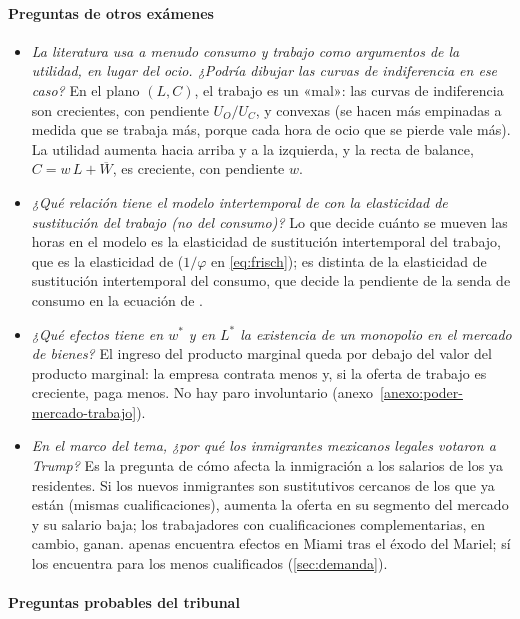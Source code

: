 \documentclass[11pt]{article}
\begin{document}
\paragraph{Preguntas de otros exámenes}

\begin{itemize}
\item \emph{La literatura usa a menudo consumo y trabajo como argumentos de la utilidad, en lugar del ocio. ¿Podría dibujar las curvas de indiferencia en ese caso?} En el plano $(L,C)$, el trabajo es un «mal»: las curvas de indiferencia son crecientes, con pendiente $U_O/U_C$, y convexas (se hacen más empinadas a medida que se trabaja más, porque cada hora de ocio que se pierde vale más). La utilidad aumenta hacia arriba y a la izquierda, y la recta de balance, $C=w\,L+\overline{W}$, es creciente, con pendiente $w$.
\item \emph{¿Qué relación tiene el modelo intertemporal de  con la elasticidad de sustitución del trabajo (no del consumo)?} Lo que decide cuánto se mueven las horas en el modelo es la elasticidad de sustitución intertemporal del trabajo, que es la elasticidad de  ($1/\varphi$ en \eqref{eq:frisch}); es distinta de la elasticidad de sustitución intertemporal del consumo, que decide la pendiente de la senda de consumo en la ecuación de  .
\item \emph{¿Qué efectos tiene en $w^*$ y en $L^*$ la existencia de un monopolio en el mercado de bienes?} El ingreso del producto marginal queda por debajo del valor del producto marginal: la empresa contrata menos y, si la oferta de trabajo es creciente, paga menos. No hay paro involuntario (anexo~\ref{anexo:poder-mercado-trabajo}).
\item \emph{En el marco del tema, ¿por qué los inmigrantes mexicanos legales votaron a Trump?} Es la pregunta de cómo afecta la inmigración a los salarios de los ya residentes. Si los nuevos inmigrantes son sustitutivos cercanos de los que ya están (mismas cualificaciones), aumenta la oferta en su segmento del mercado y su salario baja; los trabajadores con cualificaciones complementarias, en cambio, ganan. \textcite{Card1990Impact} apenas encuentra efectos en Miami tras el éxodo del Mariel; \textcite{Borjas2017Wage} sí los encuentra para los menos cualificados (\ref{sec:demanda}).
\end{itemize}

\paragraph{Preguntas probables del tribunal}
\end{document}
